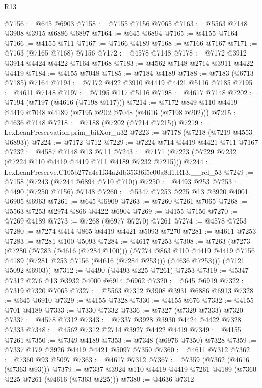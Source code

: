\begin{lexlean}{R13}
\begin{coremodule}
@7156 := @645 @6903
@7158 := @7155 @7156 @7065
@7163 := @5563 @7148 @3908 @3915 @6886 @6897
@7164 := @645 @6894
@7165 := @4155 @7164
@7166 := @4155 @711
@7167 := @7166 @4189
@7168 := @7166 @7167
@7171 := @7163 (@7165 @7168) @7156
@7172 := @4578 @7148
@7178 := @7172 @3912 @3914 @4424 @4422 @7164 @7168
@7183 := @4562 @7148 @2714 @3911 @4422 @4419
@7184 := @4155 @7048
@7185 := @7184 @4189
@7188 := @7183 (@6713 @7185) @7164
@7194 := @7172 @422 @3910 @4419 @4421 @5116 @7185
@7195 := @4611 @7148
@7197 := @7195 @117 @5116
@7198 := @4617 @7148
@7202 := @7194 (@7197 (@4616 (@7198 @117)))
@7214 := @7172 @849 @110 @4419 @4419 @7048 @4189 (@7195 @202 @7048 (@4616 (@7198 @202)))
@7215 := @4636 @7148
@7218 := @7188 (@7202 (@7214 @7215))
@7219 := LexLeanPreservation.prim_bitXor_u32
@7223 := @7178 (@7218 (@7219 @4553 @6893))
@7224 := @7172 @712
@7229 := @7224 @714 @4419 @4421 @711 @7167
@7232 := @4587 @7148 @13 @711
@7243 := @7171 (@7223 (@7229 @7232 (@7224 @110 @4419 @4419 @711 @4189 @7232 @7215)))
@7244 := LexLeanPreserve.C105b277a4c1f34a2db35336f5e00a8d1.R13.__rel_53
@7249 := @7158 (@7243 (@7244 @6894 @710 @710))
@7250 := @4493 @253
@7253 := @4490 (@7250 @7156) @7148
@7260 := @5347 @7253 @225 @13 @3920 @4001 @6905 @6963
@7261 := @645 @6909
@7263 := @7260 @7261 @7065
@7268 := @5563 @7253 @2974 @866 @4422 @6904
@7269 := @4155 @7156
@7270 := @7269 @4189
@7273 := @7268 (@6977 @7270) @7261
@7274 := @4578 @7253
@7280 := @7274 @414 @865 @4419 @4421 @5093 @7270
@7281 := @4611 @7253
@7283 := @7281 @100 @5093
@7284 := @4617 @7253
@7308 := @7263
    (@7273
      (@7280
        (@7283 (@4616 (@7284 @100)))
        (@7274
          @863
          @110
          @4419
          @4419
          @7156
          @4189
          (@7281 @253 @7156 (@4616 (@7284 @253)))
          (@4636 @7253)))
      (@7121 @5092 @6903))
@7312 := @4490 (@4493 @225 @7261) @7253
@7319 := @5347 @7312 @276 @13 @3932 @4000 @6914 @6962
@7320 := @645 @6919
@7322 := @7319 @7320 @7065
@7327 := @5563 @7312 @3908 @3931 @6886 @6913
@7328 := @645 @6910
@7329 := @4155 @7328
@7330 := @4155 @676
@7332 := @4155 @701 @4189
@7333 := @7330 @7332
@7336 := @7327 (@7329 @7333) @7320
@7337 := @4578 @7312
@7343 := @7337 @3928 @3930 @4424 @4422 @7328 @7333
@7348 := @4562 @7312 @2714 @3927 @4422 @4419
@7349 := @4155 @7261
@7350 := @7349 @4189
@7353 := @7348 (@6976 @7350) @7328
@7359 := @7337 @179 @3926 @4419 @4421 @5097 @7350
@7360 := @4611 @7312
@7362 := @7360 @93 @5097
@7363 := @4617 @7312
@7367 := @7359 (@7362 (@4616 (@7363 @93)))
@7379 := @7337 @3924 @110 @4419 @4419 @7261 @4189 (@7360 @225 @7261 (@4616 (@7363 @225)))
@7380 := @4636 @7312

\end{coremodule}
\end{lexlean}
